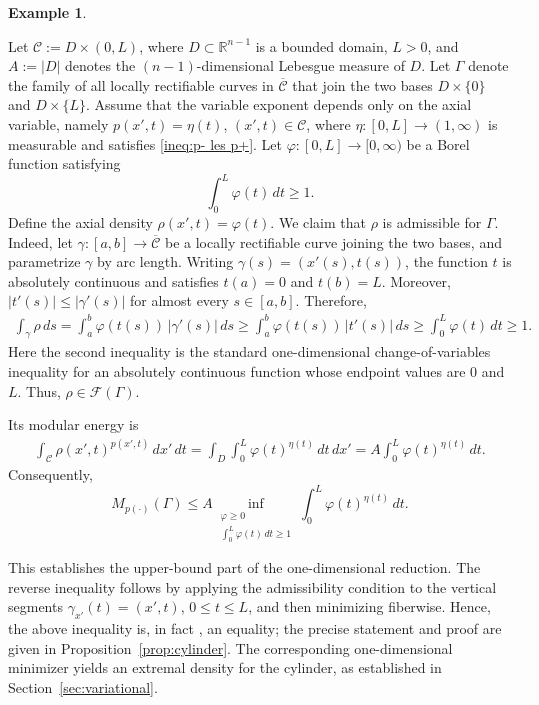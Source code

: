 \documentclass[12pt]{amsart}
\numberwithin{equation}{section}
\theoremstyle{plain}
\theoremstyle{definition}
\newtheorem{example}[equation]{Example}
\begin{document}
\begin{example}
\label{ex:cylinder}
\rm

Let $\mathcal C
:=
D\times(0,L)$,
where $D\subset\mathbb{R}^{n-1}$ is a bounded domain, $L>0$, and $A:=|D|$
denotes the $(n-1)$-dimensional Lebesgue measure of $D$. Let $\Gamma$
denote the family of all locally rectifiable curves in
$\overline{\mathcal C}$ that join the two bases $D\times\{0\}$ and $D\times\{L\}$.
Assume that the variable exponent depends only on the axial variable,
namely $p(x',t)=\eta(t)$, $(x',t)\in\mathcal C$,
where $\eta:[0,L]\longrightarrow(1,\infty)$
is measurable and satisfies \eqref{ineq:p- les p+}.
Let $\varphi:[0,L]\longrightarrow[0,\infty)$
be a Borel function satisfying
\begin{equation*}
\int_0^L\varphi(t)\,dt\ge1.
\end{equation*}
Define the axial density
$\rho(x',t)=\varphi(t)$.
We claim that $\rho$ is admissible for $\Gamma$.
Indeed, let $\gamma:[a,b]\longrightarrow\overline{\mathcal C}$
be a locally rectifiable curve joining the two bases, and parametrize
$\gamma$ by arc length. Writing $\gamma(s)=(x'(s),t(s))$,
the function $t$ is absolutely continuous and satisfies $t(a)=0$ and
$t(b)=L$.
Moreover, $|t'(s)|
\le
|\gamma'(s)|$ for almost every $s\in[a,b]$.
Therefore,
\begin{align*}
\int_\gamma \rho\,ds
=
\int_a^b \varphi(t(s))\,|\gamma'(s)|\,ds
\ge
\int_a^b \varphi(t(s))\,|t'(s)|\,ds
\ge
\int_0^L\varphi(t)\,dt
\ge1.
\end{align*}
Here the second inequality is the standard one-dimensional
change-of-variables inequality for an absolutely continuous function
whose endpoint values are $0$ and $L$. Thus, $\rho\in\mathcal F(\Gamma)$.

Its modular energy is
\begin{align*}
\int_{\mathcal C}\rho(x',t)^{p(x',t)}\,dx'\,dt
=
\int_D\int_0^L
\varphi(t)^{\eta(t)}\,dt\,dx'
=
A\int_0^L
\varphi(t)^{\eta(t)}\,dt.
\end{align*}
Consequently,
\begin{equation*}
M_{p(\cdot)}(\Gamma)
\le
A
\inf_{\substack{\varphi\ge0\\
\int_0^L\varphi(t)\,dt\ge1}}
\int_0^L\varphi(t)^{\eta(t)}\,dt.
\end{equation*}

This establishes the upper-bound part of the one-dimensional
reduction. The reverse inequality follows by applying the admissibility
condition to the vertical segments $\gamma_{x'}(t)=(x',t)$, $0\le t\le L$,
and then minimizing fiberwise. Hence, the above inequality is, in fact
, an equality; the precise statement and proof are given in
Proposition~\ref{prop:cylinder}. The corresponding one-dimensional
minimizer yields an extremal density for the cylinder, as established
in Section~\ref{sec:variational}.
\end{example}
\end{document}
